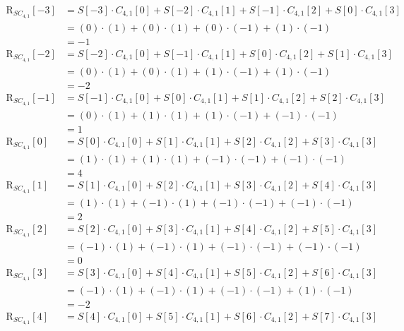 \begin{solution}
\begin{tasks}
{			\begin{equation*}
			\begin{split}
			\mathrm{R}_{SC_{4,1}}[-3] &= S[-3] \cdot C_{4,1}[0] + S[-2] \cdot C_{4,1}[1] + S[-1] \cdot C_{4,1}[2] + S[0] \cdot C_{4,1}[3] \\
			&= (0) \cdot (1) + (0) \cdot (1) + (0) \cdot (-1) + (1) \cdot (-1) \\
			&= -1 \\
			\mathrm{R}_{SC_{4,1}}[-2] &= S[-2] \cdot C_{4,1}[0] + S[-1] \cdot C_{4,1}[1] + S[0] \cdot C_{4,1}[2] + S[1] \cdot C_{4,1}[3] \\
			&= (0) \cdot (1) + (0) \cdot (1) + (1) \cdot (-1) + (1) \cdot (-1) \\
			&= -2 \\
			\mathrm{R}_{SC_{4,1}}[-1] &= S[-1] \cdot C_{4,1}[0] + S[0] \cdot C_{4,1}[1] + S[1] \cdot C_{4,1}[2] + S[2] \cdot C_{4,1}[3] \\
			&= (0) \cdot (1) + (1) \cdot (1) + (1) \cdot (-1) + (-1) \cdot (-1) \\
			&= 1 \\
			\mathrm{R}_{SC_{4,1}}[0] &= S[0] \cdot C_{4,1}[0] + S[1] \cdot C_{4,1}[1] + S[2] \cdot C_{4,1}[2] + S[3] \cdot C_{4,1}[3] \\
			&= (1) \cdot (1) + (1) \cdot (1) + (-1) \cdot (-1) + (-1) \cdot (-1) \\
			&= 4 \\
			\mathrm{R}_{SC_{4,1}}[1] &= S[1] \cdot C_{4,1}[0] + S[2] \cdot C_{4,1}[1] + S[3] \cdot C_{4,1}[2] + S[4] \cdot C_{4,1}[3] \\
			&= (1) \cdot (1) + (-1) \cdot (1) + (-1) \cdot (-1) + (-1) \cdot (-1) \\
			&= 2 \\
			\mathrm{R}_{SC_{4,1}}[2] &= S[2] \cdot C_{4,1}[0] + S[3] \cdot C_{4,1}[1] + S[4] \cdot C_{4,1}[2] + S[5] \cdot C_{4,1}[3] \\
			&= (-1) \cdot (1) + (-1) \cdot (1) + (-1) \cdot (-1) + (-1) \cdot (-1) \\
			&= 0 \\
			\mathrm{R}_{SC_{4,1}}[3] &= S[3] \cdot C_{4,1}[0] + S[4] \cdot C_{4,1}[1] + S[5] \cdot C_{4,1}[2] + S[6] \cdot C_{4,1}[3] \\
			&= (-1) \cdot (1) + (-1) \cdot (1) + (-1) \cdot (-1) + (1) \cdot (-1) \\
			&= -2 \\
			\mathrm{R}_{SC_{4,1}}[4] &= S[4] \cdot C_{4,1}[0] + S[5] \cdot C_{4,1}[1] + S[6] \cdot C_{4,1}[2] + S[7] \cdot C_{4,1}[3] \\

\end{split}
\end{equation*}}
\end{tasks}
\end{solution}
